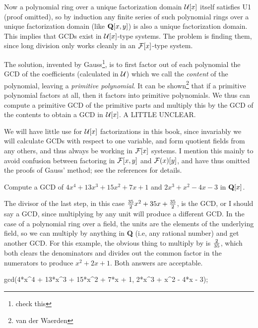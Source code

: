 Now a polynomial ring over a unique factorization domain ${\cal U}[x]$
itself satisfies U1 (proof omitted), so by induction any finite series
of such polynomial rings over a unique factorization domain (like
${\bf Q}[x,y]$) is also a unique factorization domain.  This implies
that GCDs exist in ${\cal U}[x]$-type systems.  The problem is finding
them, since long division only works cleanly in an ${\cal F}[x]$-type
system.

The solution, invented by Gauss\footnote{check this}, is to first
factor out of each polynomial the GCD of the coefficients (calculated
in ${\cal U}$) which we call the {\it content} of the polynomial,
leaving a {\it primitive polynomial}.  It can be shown\footnote{van
der Waerden} that if a primitive polynomial factors at all, then it
factors into primitive polynomials.  We thus can compute a primitive
GCD of the primitive parts and multiply this by the GCD of the
contents to obtain a GCD in ${\cal U}[x]$.  A LITTLE UNCLEAR.

We will have little use for ${\cal U}[x]$ factorizations in this book,
since invariably we will calculate GCDs with respect to one variable,
and form quotient fields from any others, and thus always be working
in ${\cal F}[x]$ systems.  I mention this mainly to avoid confusion
between factoring in ${\cal F}[x,y]$ and ${\cal F}(x)[y]$, and have
thus omitted the proofs of Gauss' method; see the references for
details.

\vfill\eject

\example

Compute a GCD of $4x^4+13x^3+15x^2+7x+1$ and $2x^3+x^2-4x-3$ in ${\bf Q}[x]$.

\bigskip


The divisor of the last step, in this case ${35\over2}x^2+35x+{35\over2}$,
is the GCD, or I should say a GCD, since multiplying by any unit
will produce a different GCD.  In the case of a polynomial ring over
a field, the units are the elements of the underlying field,
so we can multiply by anything in {\bf Q} (i.e, any rational number)
and get another GCD.  For this example, the obvious thing to multiply
by is $2\over35$, which both clears the denominators and divides out
the common factor in the numerators to produce $x^2+2x+1$.  Both
answers are acceptable.

\begin{maximacode}
gcd(4*x^4 + 13*x^3 + 15*x^2 + 7*x + 1,
    2*x^3 + x^2 - 4*x - 3);
\end{maximacode}

